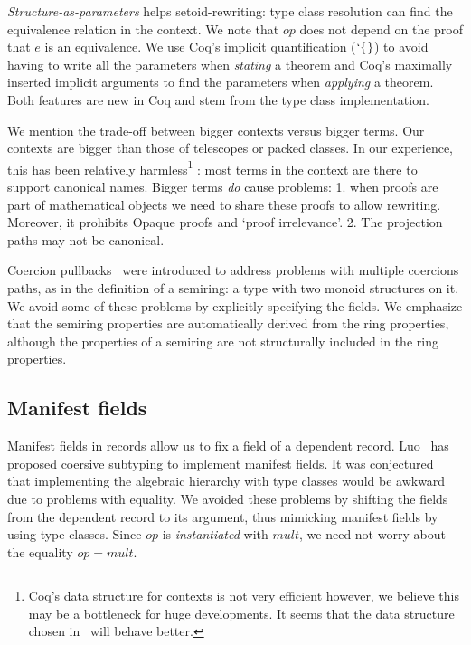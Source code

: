 \documentclass[a4paper,10pt, runningheads]{llncs}
\newcommand{\Varid}[1]{\mathit{#1}}
\begin{document}
\emph{Structure-as-parameters} helps setoid-rewriting: type class resolution
can find the equivalence relation in the context.
We note that \ensuremath{\Varid{op}} does not depend on the proof that \ensuremath{\Varid{e}} is an equivalence. We use Coq's implicit
quantification (\ensuremath{\hspace*{0mm}`\hspace*{0mm}\{\mskip1.5mu\}}) to avoid having to write all the parameters when \emph{stating} a theorem
and Coq's maximally inserted implicit arguments to find the parameters when \emph{applying} a
theorem. Both features are new in Coq and stem from the type class implementation.

We mention the trade-off between bigger contexts versus bigger terms. Our contexts are bigger than
those of telescopes or packed classes. In our experience, this has been relatively
harmless\footnote{Coq's data structure for contexts is not very efficient however, we believe this
may be a bottleneck for huge developments. It seems that the data structure chosen
in~\cite{asperti2009compact} will behave better.}%
: most
terms in the context are there to support canonical names. Bigger terms
\emph{do} cause problems: 1. when proofs are part of mathematical objects we need to share these
proofs to allow rewriting. Moreover, it prohibits Opaque proofs and `proof irrelevance'. 2. The
projection paths may not be canonical.

Coercion pullbacks~\cite{Hints} were introduced to address problems with multiple coercions paths,
as in the definition of a semiring: a type with two monoid structures on it. We avoid some
of these problems by explicitly specifying the fields. We emphasize that the semiring properties are automatically derived from the ring
properties, although the properties of a semiring are not structurally included in the ring
properties.

\subsection{Manifest fields}\label{manifest}

Manifest fields in records allow us to fix a field of a dependent record.
Luo~\cite{DBLP:conf/types/Luo08} has proposed coersive subtyping to implement manifest fields.
It was conjectured~\cite{Hints} that implementing the algebraic hierarchy with type classes would
be awkward due to problems with equality. We avoided these problems by shifting the fields
from the dependent record to its argument, thus mimicking manifest fields by using type classes.
Since \ensuremath{\Varid{op}} is \emph{instantiated} with \ensuremath{\Varid{mult}}, we need not worry about the
equality \ensuremath{\Varid{op=mult}}.
\end{document}
